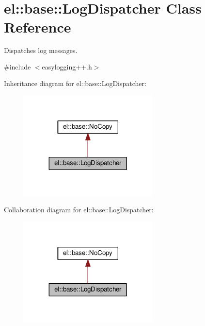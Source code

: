 \hypertarget{classel_1_1base_1_1_log_dispatcher}{}\section{el\+:\+:base\+:\+:Log\+Dispatcher Class Reference}
\label{classel_1_1base_1_1_log_dispatcher}


Dispatches log messages.  




{\ttfamily \#include $<$easylogging++.\+h$>$}



Inheritance diagram for el\+:\+:base\+:\+:Log\+Dispatcher\+:
\nopagebreak
\begin{figure}[H]
\begin{center}
\leavevmode
\includegraphics[width=200pt]{classel_1_1base_1_1_log_dispatcher__inherit__graph}
\end{center}
\end{figure}


Collaboration diagram for el\+:\+:base\+:\+:Log\+Dispatcher\+:
\nopagebreak
\begin{figure}[H]
\begin{center}
\leavevmode
\includegraphics[width=200pt]{classel_1_1base_1_1_log_dispatcher__coll__graph}
\end{center}
\end{figure}

